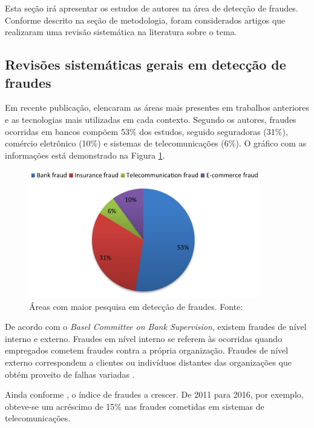 \documentclass[smallextended]{svjour3}
\begin{document}
Esta seção irá apresentar os estudos de autores na área de detecção de fraudes. Conforme descrito na seção de metodologia, foram considerados artigos que realizaram uma revisão sistemática na literatura sobre o tema.

\subsection{Revisões sistemáticas gerais em detecção de fraudes}

Em recente publicação, \cite{Abdallah2016} elencaram as áreas mais presentes em trabalhos anteriores e as tecnologias mais utilizadas em cada contexto. Segundo os autores, fraudes ocorridas em bancos compõem 53\% dos estudos, seguido seguradoras (31\%), comércio eletrônico (10\%) e sistemas de telecomunicações (6\%). O gráfico com as informações está demonstrado na Figura \ref{fig:fraudespopulares}. 

\begin{figure}[!ht]
	\centering
	\includegraphics[width=0.9\textwidth]{imagens/fraudespopulares.jpg}
	\caption{Áreas com maior pesquisa em detecção de fraudes. Fonte: \cite{Abdallah2016}}
	\label{fig:fraudespopulares}
\end{figure}

De acordo com o \emph{Basel Committee on Bank Supervision}, existem fraudes de nível interno e externo. Fraudes em nível interno se referem às ocorridas quando empregados cometem fraudes contra a própria organização. Fraudes de nível externo correspondem a clientes ou indivíduos distantes das organizações que obtém proveito de falhas variadas \citep{Abdallah2016}.

Ainda conforme \cite{Abdallah2016}, o índice de fraudes a crescer. De 2011 para 2016, por exemplo, obteve-se um acréscimo de 15\% nas fraudes cometidas em sistemas de telecomunicações.
\end{document}
